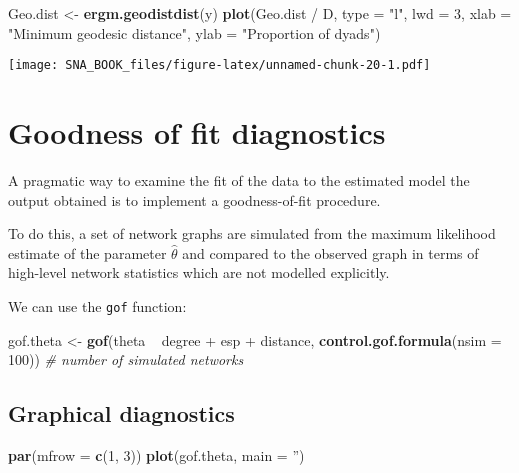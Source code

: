 \documentclass[]{book}
\newenvironment{Shaded}{\begin{snugshade}}{\end{snugshade}}
\newcommand{\KeywordTok}[1]{\textcolor[rgb]{0.13,0.29,0.53}{\textbf{{#1}}}}
\newcommand{\DataTypeTok}[1]{\textcolor[rgb]{0.13,0.29,0.53}{{#1}}}
\newcommand{\DecValTok}[1]{\textcolor[rgb]{0.00,0.00,0.81}{{#1}}}
\newcommand{\StringTok}[1]{\textcolor[rgb]{0.31,0.60,0.02}{{#1}}}
\newcommand{\CommentTok}[1]{\textcolor[rgb]{0.56,0.35,0.01}{\textit{{#1}}}}
\newcommand{\NormalTok}[1]{{#1}}
\begin{document}
\begin{Shaded}
\begin{Highlighting}[]
\NormalTok{Geo.dist <-}\StringTok{ }\KeywordTok{ergm.geodistdist}\NormalTok{(y)}
\KeywordTok{plot}\NormalTok{(Geo.dist /}\StringTok{ }\NormalTok{D, }\DataTypeTok{type =} \StringTok{"l"}\NormalTok{, }\DataTypeTok{lwd =} \DecValTok{3}\NormalTok{,}
     \DataTypeTok{xlab =} \StringTok{"Minimum geodesic distance"}\NormalTok{,}
     \DataTypeTok{ylab =} \StringTok{"Proportion of dyads"}\NormalTok{)}
\end{Highlighting}
\end{Shaded}

\texttt{[image: SNA\_BOOK\_files/figure-latex/unnamed-chunk-20-1.pdf]}

\section{Goodness of fit diagnostics}\label{goodness-of-fit-diagnostics}

A pragmatic way to examine the fit of the data to the estimated model
the output obtained is to implement a goodness-of-fit procedure.

To do this, a set of network graphs are simulated from the maximum
likelihood estimate of the parameter \(\hat{\theta}\) and compared to
the observed graph in terms of high-level network statistics which are
not modelled explicitly.

We can use the \texttt{gof} function:

\begin{Shaded}
\begin{Highlighting}[]
\NormalTok{gof.theta <-}\StringTok{ }\KeywordTok{gof}\NormalTok{(theta ~}\StringTok{ }\NormalTok{degree +}\StringTok{ }\NormalTok{esp +}\StringTok{ }\NormalTok{distance,}
                 \KeywordTok{control.gof.formula}\NormalTok{(}\DataTypeTok{nsim =} \DecValTok{100}\NormalTok{)) }\CommentTok{# number of simulated networks}
\end{Highlighting}
\end{Shaded}

\subsection{Graphical diagnostics}\label{graphical-diagnostics}

\begin{Shaded}
\begin{Highlighting}[]
\KeywordTok{par}\NormalTok{(}\DataTypeTok{mfrow =} \KeywordTok{c}\NormalTok{(}\DecValTok{1}\NormalTok{, }\DecValTok{3}\NormalTok{))}
\KeywordTok{plot}\NormalTok{(gof.theta, }\DataTypeTok{main =} \StringTok{''}\NormalTok{)}
\end{Highlighting}
\end{Shaded}
\end{document}
